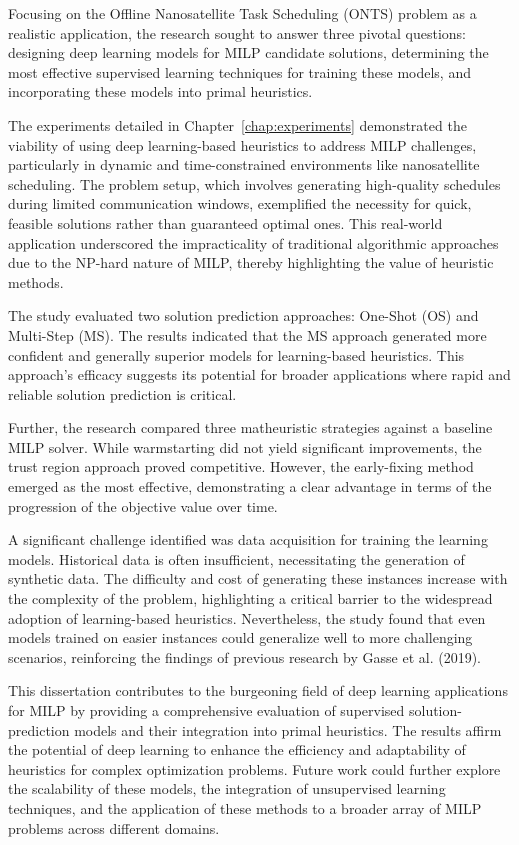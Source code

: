 Focusing on the Offline Nanosatellite Task Scheduling (ONTS) problem as a realistic application, the research sought to answer three pivotal questions: designing deep learning models for MILP candidate solutions, determining the most effective supervised learning techniques for training these models, and incorporating these models into primal heuristics.



The experiments detailed in Chapter~\ref{chap:experiments} demonstrated the viability of using deep learning-based heuristics to address MILP challenges, particularly in dynamic and time-constrained environments like nanosatellite scheduling.
The problem setup, which involves generating high-quality schedules during limited communication windows, exemplified the necessity for quick, feasible solutions rather than guaranteed optimal ones.
This real-world application underscored the impracticality of traditional algorithmic approaches due to the NP-hard nature of MILP, thereby highlighting the value of heuristic methods.

The study evaluated two solution prediction approaches: One-Shot (OS) and Multi-Step (MS).
The results indicated that the MS approach generated more confident and generally superior models for learning-based heuristics.
This approach's efficacy suggests its potential for broader applications where rapid and reliable solution prediction is critical.

Further, the research compared three matheuristic strategies against a baseline MILP solver.
While warmstarting did not yield significant improvements, the trust region approach proved competitive.
However, the early-fixing method emerged as the most effective, demonstrating a clear advantage in terms of the progression of the objective value over time.

A significant challenge identified was data acquisition for training the learning models.
Historical data is often insufficient, necessitating the generation of synthetic data.
The difficulty and cost of generating these instances increase with the complexity of the problem, highlighting a critical barrier to the widespread adoption of learning-based heuristics.
Nevertheless, the study found that even models trained on easier instances could generalize well to more challenging scenarios, reinforcing the findings of previous research by Gasse et al.
(2019).

This dissertation contributes to the burgeoning field of deep learning applications for MILP by providing a comprehensive evaluation of supervised solution-prediction models and their integration into primal heuristics.
The results affirm the potential of deep learning to enhance the efficiency and adaptability of heuristics for complex optimization problems. Future work could further explore the scalability of these models, the integration of unsupervised learning techniques, and the application of these methods to a broader array of MILP problems across different domains.

